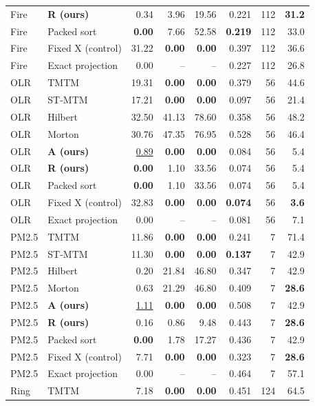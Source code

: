 \begin{longtable}{llrrrrrr}
Fire & \textbf{R (ours)} & 0.34 & 3.96 & 19.56 & 0.221 & 112 & \textbf{31.2}\\
Fire & Packed sort & \textbf{0.00} & 7.66 & 52.58 & \textbf{0.219} & 112 & 33.0\\
Fire & Fixed X (control) & 31.22 & \textbf{0.00} & \textbf{0.00} & 0.397 & 112 & 36.6\\
Fire & Exact projection & 0.00 & -- & -- & 0.227 & 112 & 26.8\\
OLR & TMTM & 19.31 & \textbf{0.00} & \textbf{0.00} & 0.379 & 56 & 44.6\\
OLR & ST-MTM & 17.21 & \textbf{0.00} & \textbf{0.00} & 0.097 & 56 & 21.4\\
OLR & Hilbert & 32.50 & 41.13 & 78.60 & 0.358 & 56 & 48.2\\
OLR & Morton & 30.76 & 47.35 & 76.95 & 0.528 & 56 & 46.4\\
OLR & \textbf{A (ours)} & \underline{0.89} & \textbf{0.00} & \textbf{0.00} & 0.084 & 56 & 5.4\\
OLR & \textbf{R (ours)} & \textbf{0.00} & 1.10 & 33.56 & 0.074 & 56 & 5.4\\
OLR & Packed sort & \textbf{0.00} & 1.10 & 33.56 & 0.074 & 56 & 5.4\\
OLR & Fixed X (control) & 32.83 & \textbf{0.00} & \textbf{0.00} & \textbf{0.074} & 56 & \textbf{3.6}\\
OLR & Exact projection & 0.00 & -- & -- & 0.081 & 56 & 7.1\\
PM2.5 & TMTM & 11.86 & \textbf{0.00} & \textbf{0.00} & 0.241 & 7 & 71.4\\
PM2.5 & ST-MTM & 11.30 & \textbf{0.00} & \textbf{0.00} & \textbf{0.137} & 7 & 42.9\\
PM2.5 & Hilbert & 0.20 & 21.84 & 46.80 & 0.347 & 7 & 42.9\\
PM2.5 & Morton & 0.63 & 21.29 & 46.80 & 0.409 & 7 & \textbf{28.6}\\
PM2.5 & \textbf{A (ours)} & \underline{1.11} & \textbf{0.00} & \textbf{0.00} & 0.508 & 7 & 42.9\\
PM2.5 & \textbf{R (ours)} & 0.16 & 0.86 & 9.48 & 0.443 & 7 & \textbf{28.6}\\
PM2.5 & Packed sort & \textbf{0.00} & 1.78 & 17.27 & 0.436 & 7 & 42.9\\
PM2.5 & Fixed X (control) & 7.71 & \textbf{0.00} & \textbf{0.00} & 0.323 & 7 & \textbf{28.6}\\
PM2.5 & Exact projection & 0.00 & -- & -- & 0.464 & 7 & 57.1\\
Ring & TMTM & 7.18 & \textbf{0.00} & \textbf{0.00} & 0.451 & 124 & 64.5\\

\end{longtable}
